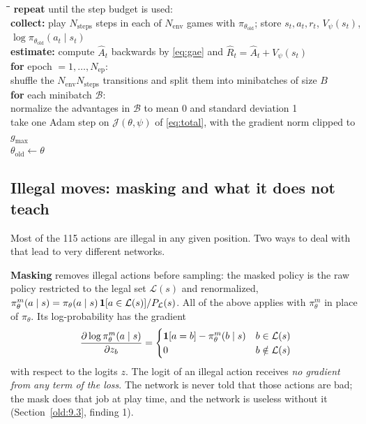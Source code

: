 \begin{algorithm}[H]
\caption{One training run of PPO (the form used for every model; Sections~\ref{old:4}--\ref{old:5})}\label{alg:ppo}
\begin{tabbing}
\hspace{1.6em}\=\hspace{1.6em}\=\hspace{1.6em}\=\kill
\textbf{repeat} until the step budget is used: \\
\> \textbf{collect:} play $N_{\text{steps}}$ steps in each of $N_{\text{env}}$ games with $\pi_{\theta_{\text{old}}}$; store $s_t, a_t, r_t$, $V_\psi(s_t)$, $\log \pi_{\theta_{\text{old}}}(a_t \mid s_t)$ \\
\> \textbf{estimate:} compute $\hat A_t$ backwards by \eqref{eq:gae} and $\hat R_t = \hat A_t + V_\psi(s_t)$ \\
\> \textbf{for} epoch $= 1, \dots, N_{\text{ep}}$: \\
\>\> shuffle the $N_{\text{env}} N_{\text{steps}}$ transitions and split them into minibatches of size $B$ \\
\>\> \textbf{for} each minibatch $\mathcal{B}$: \\
\>\>\> normalize the advantages in $\mathcal{B}$ to mean 0 and standard deviation 1 \\
\>\>\> take one Adam step on $\mathcal{J}(\theta, \psi)$ of \eqref{eq:total}, with the gradient norm clipped to $g_{\max}$ \\
\> $\theta_{\text{old}} \leftarrow \theta$
\end{tabbing}
\end{algorithm}

\subsection{Illegal moves: masking and what it does not teach}\label{sec:fp-mask}

Most of the 115 actions are illegal in any given position. Two ways to deal with that lead to very
different networks.

\textbf{Masking} removes illegal actions before sampling: the masked policy is the raw policy restricted to the
legal set $\mathcal{L}(s)$ and renormalized, $\pi^m_\theta(a \mid s) = \pi_\theta(a \mid s)\, \mathbf{1}[a \in \mathcal{L}(s)] / P_{\mathcal{L}}(s)$.
All of the above applies with $\pi^m_\theta$ in place of $\pi_\theta$. Its log-probability has the gradient
\[
\frac{\partial \log \pi^m_\theta(a \mid s)}{\partial z_b} =
\begin{cases} \mathbf{1}[a = b] - \pi^m_\theta(b \mid s) & b \in \mathcal{L}(s) \\ 0 & b \notin \mathcal{L}(s) \end{cases}
\]
with respect to the logits $z$. The logit of an illegal action receives \emph{no gradient from any term of
the loss}. The network is never told that those actions are bad; the mask does that job at play time, and
the network is useless without it (Section~\ref{old:9.3}, finding 1).

